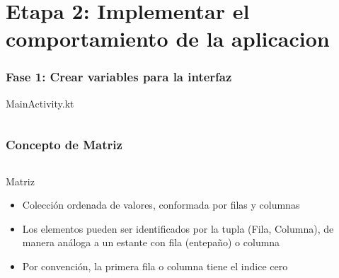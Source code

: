 

\section{Etapa 2: Implementar el comportamiento de la aplicacion }

\begin{frame}[fragile]
\frametitle{Fase 1: Crear variables para la interfaz} 
\begin{block}{MainActivity.kt}
\inputminted[linenos,fontsize=\tiny]{kotlin}{00_ComportamientoAplicacionTicTacToe/mainActivity.kt}
\end{block}

\end{frame}


\begin{frame}[fragile]
\frametitle{Concepto de Matriz}
\begin{columns}
 
\begin{block}{Matriz}
\begin{itemize}
\item Colecci\'on ordenada de valores, conformada por filas y columnas
\item Los elementos pueden ser identificados por la tupla (Fila, Columna), de manera an\'aloga a un estante con fila (entepa\~no) o columna
\item Por convenci\'on, la primera fila o columna tiene el indice cero
\end{itemize}
 \end{block}


\end{columns}
\end{frame}
